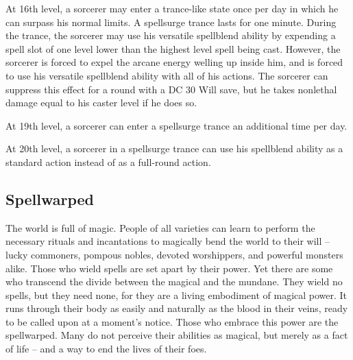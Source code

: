  At 16th level, a sorcerer may enter a trance-like state once per day in which he can surpass his normal limits. A spellsurge trance lasts for one minute. During the trance, the sorcerer may use his versatile spellblend ability by expending a spell slot of one level lower than the highest level spell being cast. However, the sorcerer is forced to expel the arcane energy welling up inside him, and is forced to use his versatile spellblend ability with all of his actions. The sorcerer can suppress this effect for a round with a DC 30 Will save, but he takes nonlethal damage equal to his caster level if he does so. %

\par At 19th level, a sorcerer can enter a spellsurge trance an additional time per day.

 At 20th level, a sorcerer in a spellsurge trance can use his spellblend ability as a standard action instead of as a full-round action.

\subsection{Spellwarped}
The world is full of magic. People of all varieties can learn to perform the necessary rituals and incantations to magically bend the world to their will -- lucky commoners, pompous nobles, devoted worshippers, and powerful monsters alike. Those who wield spells are set apart by their power. Yet there are some who transcend the divide between the magical and the mundane. They wield no spells, but they need none, for they are a living embodiment of magical power. It runs through their body as easily and naturally as the blood in their veins, ready to be called upon at a moment's notice. Those who embrace this power are the spellwarped. Many do not perceive their abilities as magical, but merely as a fact of life -- and a way to end the lives of their foes.


